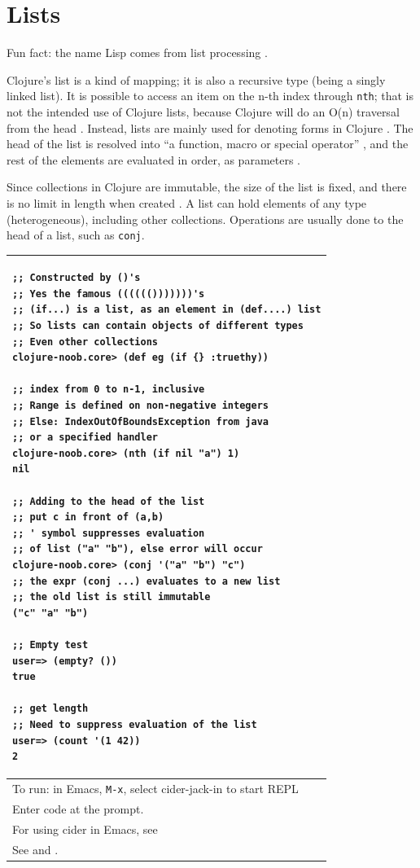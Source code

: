 \documentclass[12pt]{article}
\begin{document}
\part{Lists}


Fun fact: the name Lisp  comes from list processing \cite{fogus2014joy}.

Clojure's list is a kind of mapping; it is also a recursive type (being a singly linked list). It is possible to access an item on the n-th index through \texttt{nth}; that is not the intended use of Clojure lists, because Clojure will do an O(n) traversal from the head \cite{fogus2014joy}. Instead, lists are mainly used for denoting forms in Clojure \cite{fogus2014joy}. The head of the list is resolved into ``a function, macro or special operator'' , and the rest of the elements are evaluated in order, as parameters \cite{fogus2014joy}.

Since collections in Clojure are immutable, the size of the list is fixed, and there is no limit in length when created \cite{fogus2014joy}. A list can hold elements of any type (heterogeneous), including other collections. Operations are usually done to the head of a list, such as \texttt{conj}.

\begin{tabular}{|p{}|}
\hline
\begin{verbatim}
;; Constructed by ()'s
;; Yes the famous (((((()))))))'s
;; (if...) is a list, as an element in (def....) list
;; So lists can contain objects of different types
;; Even other collections
clojure-noob.core> (def eg (if {} :truethy))

;; index from 0 to n-1, inclusive
;; Range is defined on non-negative integers
;; Else: IndexOutOfBoundsException from java
;; or a specified handler
clojure-noob.core> (nth (if nil "a") 1)
nil

;; Adding to the head of the list
;; put c in front of (a,b)
;; ' symbol suppresses evaluation
;; of list ("a" "b"), else error will occur
clojure-noob.core> (conj '("a" "b") "c")
;; the expr (conj ...) evaluates to a new list
;; the old list is still immutable 
("c" "a" "b")

;; Empty test
user=> (empty? ())
true

;; get length
;; Need to suppress evaluation of the list
user=> (count '(1 42))
2
\end{verbatim}
\\
\hline
To run: in Emacs, \texttt{M-x}, select cider-jack-in to start REPL\\
Enter code at the prompt.\\
For using cider in Emacs, see \cite{brave2015}\\
\hline
See \cite{fogus2014joy} and \cite{empty}.\\
\hline
\end{tabular}
\end{document}
